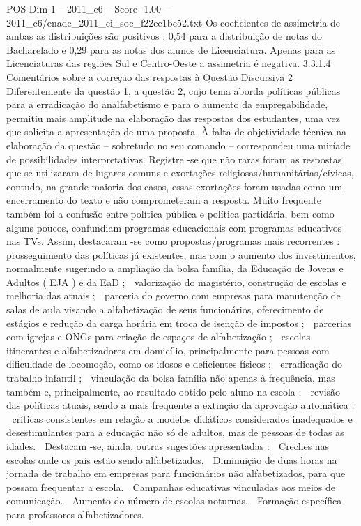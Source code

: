 \begin{textsample}{POS Dim 1 – 2011\_c6 – Score -1.00 – 2011\_c6/enade\_2011\_ci\_soc\_f22ee1bc52.txt}
Os coeficientes de assimetria de ambas as distribuições são positivos : 0,54 para a distribuição de notas do Bacharelado e 0,29 para as notas dos alunos de Licenciatura.
Apenas para as Licenciaturas das regiões Sul e Centro-Oeste a assimetria é negativa. 3.3.1.4 Comentários sobre a correção das respostas à Questão Discursiva 2 Diferentemente da questão 1, a questão 2, cujo tema aborda políticas públicas para a erradicação do analfabetismo e para o aumento da empregabilidade, permitiu mais amplitude na elaboração das respostas dos estudantes, uma vez que solicita a apresentação de uma proposta.
À falta de objetividade técnica na elaboração da questão – sobretudo no seu comando – correspondeu uma miríade de possibilidades interpretativas.
Registre -se que não raras foram as respostas que se utilizaram de lugares comuns e exortações religiosas/humanitárias/cívicas, contudo, na grande maioria dos casos, essas exortações foram usadas como um encerramento do texto e não comprometeram a resposta.
Muito frequente também foi a confusão entre política pública e política partidária, bem como alguns poucos, confundiam programas educacionais com programas educativos nas TVs.
Assim, destacaram -se como propostas/programas mais recorrentes :  prosseguimento das políticas já existentes, mas com o aumento dos investimentos, normalmente sugerindo a ampliação da bolsa família, da Educação de Jovens e Adultos ( EJA ) e da EaD ;  valorização do magistério, construção de escolas e melhoria das atuais ;  parceria do governo com empresas para manutenção de salas de aula visando a alfabetização de seus funcionários, oferecimento de estágios e redução da carga horária em troca de isenção de impostos ;  parcerias com igrejas e ONGs para criação de espaços de alfabetização ;  escolas itinerantes e alfabetizadores em domicílio, principalmente para pessoas com dificuldade de locomoção, como os idosos e deficientes físicos ;  erradicação do trabalho infantil ;  vinculação da bolsa família não apenas à frequência, mas também e, principalmente, ao resultado obtido pelo aluno na escola ;  revisão das políticas atuais, sendo a mais frequente a extinção da aprovação automática ;  críticas consistentes em relação a modelos didáticos considerados inadequados e desestimulantes para a educação não só de adultos, mas de pessoas de todas as idades.  Destacam -se, ainda, outras sugestões apresentadas :  Creches nas escolas onde os pais estão sendo alfabetizados.  Diminuição de duas horas na jornada de trabalho em empresas para funcionários não alfabetizados, para que possam frequentar a escola.  Campanhas educativas vinculadas aos meios de comunicação.  Aumento do número de escolas noturnas.  Formação específica para professores alfabetizadores.

\end{textsample}

